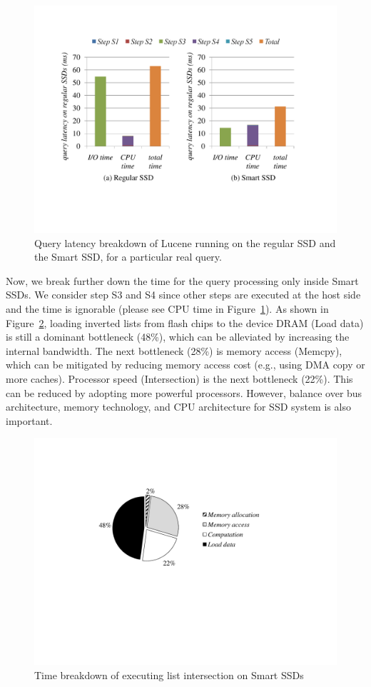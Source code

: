 \begin{figure}[tbp]
	\centering
		\includegraphics[width=1\columnwidth]{figures/timeBreakDownRegSmart.pdf}
	\caption{\small Query latency breakdown of Lucene running on the regular SSD and the Smart SSD, for a particular real query.}
	\label{fig:timeBreakDownRegSmart}
\end{figure}

Now, we break further down the time for the query processing only inside Smart SSDs. We consider step S3 and S4 since other steps are executed at the host side and the time is ignorable (please see CPU time in Figure~\ref{fig:timeBreakDownRegSmart}).
As shown in Figure~\ref{fig:timeBreakDownSmartSSD}, loading inverted lists from flash chips to the device DRAM (Load data) is still a dominant bottleneck (48\%), which can be alleviated by increasing the internal bandwidth. The next bottleneck (28\%) is memory access (Memcpy), which can be mitigated by reducing memory access cost (e.g., using DMA copy or more caches). Processor speed (Intersection) is the next bottleneck (22\%). This can be reduced by adopting more powerful processors. However, balance over bus architecture, memory technology, and CPU architecture for SSD system is also important.

\begin{figure}[tbp]
	\centering
		\includegraphics[width=0.7\columnwidth]{figures/timeBreakDownSmartSSD.pdf}
	\caption{\small Time breakdown of executing list intersection on Smart SSDs}
	\label{fig:timeBreakDownSmartSSD}
\end{figure}


